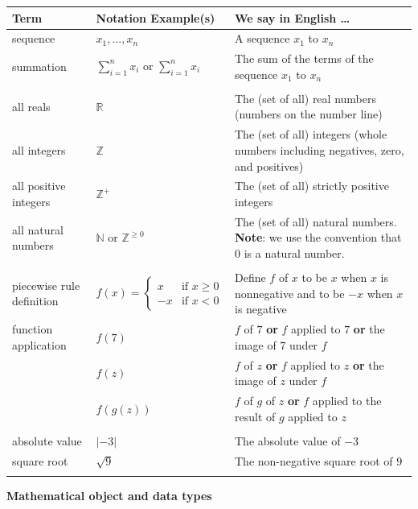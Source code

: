 \documentclass[12pt, oneside]{article}
\begin{document}
\begin{center}
\begin{tabular}{|llp{9.8cm}|}
\hline
{\bf Term} & {\bf Notation Example(s)} & {\bf We say in English \ldots } \\
\hline
sequence & $x_1, \ldots, x_n$ & A sequence $x_1$ to $x_n$ \\
summation & $\sum_{i=1}^n x_i$ or $\displaystyle{\sum_{i=1}^n x_i}$ & The sum of the terms of the sequence $x_1$ to $x_n$ \\
&&\\
all reals & $\mathbb{R}$ & The (set of all) real numbers (numbers on the number line)\\
all integers & $\mathbb{Z}$ & The (set of all) integers (whole numbers including negatives, zero, and positives) \\
all positive integers & $\mathbb{Z}^+$ & The (set of all) strictly positive integers \\
all natural numbers & $\mathbb{N}$ or $\mathbb{Z}^{\geq 0}$ & The (set of all) natural numbers. {\bf Note}: we use the convention that $0$ is a natural number. \\
&&\\
piecewise rule definition & $f(x) = \begin{cases} x & \text{if~}x \geq 0 \\ -x & \text{if~}x<0\end{cases}$ &
Define $f$ of $x$ to be $x$ when $x$ is nonnegative and to be $-x$ when $x$ is negative\\
function application & $f(7)$ & $f$ of $7$ {\bf or} $f$ applied to $7$ {\bf or} the image of $7$ under $f$\\
                     & $f(z)$ & $f$ of $z$ {\bf or} $f$ applied to $z$ {\bf or} the image of $z$ under $f$\\
                     & $f(g(z))$ & $f$ of $g$ of $z$ {\bf or} $f$ applied to the result of $g$ applied to $z$ \\
&&\\
absolute value & $\lvert -3 \rvert$ & The absolute value of $-3$ \\
square root & $\sqrt{9}$ & The non-negative square root of $9$ \\
&&\\


\hline
\end{tabular}
\end{center}

{\bf Mathematical object and data types}
\end{document}
